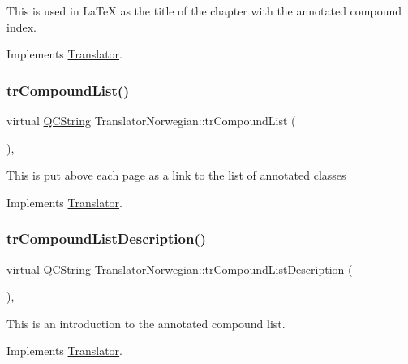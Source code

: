 This is used in La\+TeX as the title of the chapter with the annotated compound index. 

Implements \mbox{\hyperlink{class_translator}{Translator}}.

\mbox{\label{class_translator_norwegian_ae4512251b3bf5e961cd39e4007daf159}} 
\subsubsection{\texorpdfstring{trCompoundList()}{trCompoundList()}}
{\footnotesize\ttfamily virtual \mbox{\hyperlink{class_q_c_string}{Q\+C\+String}} Translator\+Norwegian\+::tr\+Compound\+List (\begin{DoxyParamCaption}{ }\end{DoxyParamCaption})\hspace{0.3cm}{\ttfamily [inline]}, {\ttfamily [virtual]}}

This is put above each page as a link to the list of annotated classes 

Implements \mbox{\hyperlink{class_translator}{Translator}}.

\mbox{\label{class_translator_norwegian_a0a70da831e02253a3fd30d785b1a77c2}} 
\subsubsection{\texorpdfstring{trCompoundListDescription()}{trCompoundListDescription()}}
{\footnotesize\ttfamily virtual \mbox{\hyperlink{class_q_c_string}{Q\+C\+String}} Translator\+Norwegian\+::tr\+Compound\+List\+Description (\begin{DoxyParamCaption}{ }\end{DoxyParamCaption})\hspace{0.3cm}{\ttfamily [inline]}, {\ttfamily [virtual]}}

This is an introduction to the annotated compound list. 

Implements \mbox{\hyperlink{class_translator}{Translator}}.

